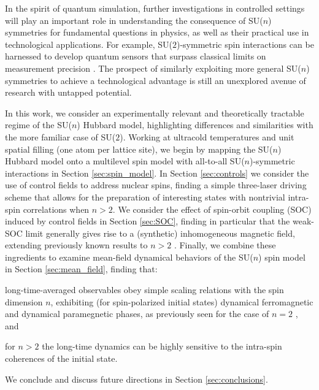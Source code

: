 \documentclass[aps,pra,nofootinbib,twocolumn,superscriptaddress]{revtex4-2}
\newcommand{\1}{\mathds{1}}
\begin{document}
In the spirit of quantum simulation, further investigations in controlled settings will play an important role in understanding the consequence of SU($n$) symmetries for fundamental questions in physics, as well as their practical use in technological applications.
For example, SU($2$)-symmetric spin interactions can be harnessed to develop quantum sensors that surpass classical limits on measurement precision \cite{he2019engineering, perlin2020spin}.
The prospect of similarly exploiting more general SU($n$) symmetries to achieve a technological advantage is still an unexplored avenue of research with untapped potential.

In this work, we consider an experimentally relevant and theoretically tractable regime of the SU($n$) Hubbard model, highlighting differences and similarities with the more familiar case of SU($2$).
Working at ultracold temperatures and unit spatial filling (one atom per lattice site), we begin by mapping the SU($n$) Hubbard model onto a multilevel spin model with all-to-all SU($n$)-symmetric interactions in Section \ref{sec:spin_model}.
In Section \ref{sec:controls} we consider the use of control fields to address nuclear spins, finding a simple three-laser driving scheme that allows for the preparation of interesting states with nontrivial intra-spin correlations when $n>2$.
We consider the effect of spin-orbit coupling (SOC) induced by control fields in Section \ref{sec:SOC}, finding in particular that the weak-SOC limit generally gives rise to a (synthetic) inhomogeneous magnetic field, extending previously known results to $n>2$ \cite{mancini2015observation, wall2016synthetic, livi2016synthetic, kolkowitz2016spinorbitcoupled, bromley2018dynamics, he2019engineering}.
Finally, we combine these ingredients to examine mean-field dynamical behaviors of the SU($n$) spin model in Section \ref{sec:mean_field}, finding that:
\begin{enumerate*}
\item long-time-averaged observables obey simple scaling relations with the spin dimension $n$, exhibiting (for spin-polarized initial states) dynamical ferromagnetic and dynamical paramegnetic phases, as previously seen for the case of $n=2$ \cite{smale2019observation, lewis-swan2021cavityqed}, and
\item for $n>2$ the long-time dynamics can be highly sensitive to the intra-spin coherences of the initial state.
\end{enumerate*}
We conclude and discuss future directions in Section \ref{sec:conclusions}.
\end{document}
